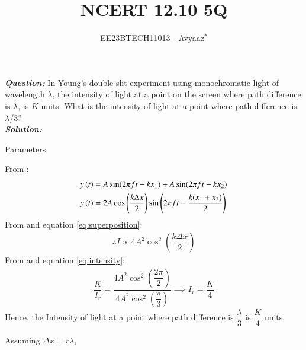 \documentclass[journal,12pt,twocolumn]{IEEEtran}
\theoremstyle{remark}
\begin{document}

\vspace{3cm}

\title{NCERT 12.10 5Q}
\author{EE23BTECH11013 - Avyaaz$^{*}$%
}
\maketitle
\newpage
\bigskip

\renewcommand{\thefigure}{\arabic{figure}}
\renewcommand{\thetable}{\arabic{table}}

\large\textbf{\textsl{Question:}}
In Young’s double-slit experiment using monochromatic light of wavelength $\lambda$, the intensity of light at a point on the screen where path difference is $\lambda$, is $K$ units. What is the intensity of light at a
point where path difference is $\lambda$/3?\\
\large\textbf{\textsl{Solution:}}
\begin{table}[htbp]
\setlength{\extrarowheight}{8pt}
\centering

\caption{Parameters}
\label{tab:parameters}
\end{table}

From :
\begin{align}
y\left(t\right) &= A\sin({2\pi f t - kx_1})  + A\sin({ 2\pi f t - kx_2}) \\
y\left(t\right) &=  2A\cos\left(\dfrac{k\Delta x}{2}\right)\sin\left(2\pi f t - \dfrac{k(x_1+x_2)}{2} \right) \label{eq:superposition}
\end{align}
From  and equation \eqref{eq:superposition}: 
\begin{align}
\therefore I \propto 4A^2\cos^2\left(\dfrac{k\Delta x}{2}\right)  \label{eq:intensity}
\end{align}
From  and equation \eqref{eq:intensity}: 
\begin{align}
 \dfrac{K}{I_r} = \dfrac{4A^2\cos^2\left(\dfrac{2\pi}{2}\right)}{4A^2\cos^2\left(\dfrac{\pi}{3}\right)}
 \implies I_r = \dfrac{K}{4}
 \end{align}
 Hence, the Intensity of light at a point where path difference is $\dfrac{\lambda}{3}$ is $\dfrac{K}{4}$ units.

\begin{table}[htbp]
\centering

\caption{}
\label{tab:intensity}
\end{table}
Assuming $\Delta x= r\lambda$, 
\end{document}
